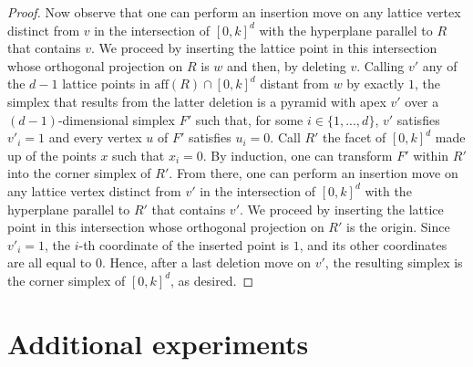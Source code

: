 \begin{proof}
Now observe that one can perform an insertion move on any lattice vertex distinct from $v$ in the intersection of $[0,k]^d$ with the hyperplane parallel to $R$ that contains $v$. We proceed by inserting the lattice point in this intersection whose orthogonal projection on $R$ is $w$ and then, by deleting $v$. Calling $v'$ any of the $d-1$ lattice points in $\mathrm{aff}(R)\cap[0,k]^d$ distant from $w$ by exactly $1$, the simplex that results from the latter deletion is a pyramid with apex $v'$ over a $(d-1)$-dimensional simplex $F'$ such that, for some $i\in\{1, ..., d\}$, $v'$ satisfies $v'_i=1$ and every vertex $u$ of $F'$ satisfies $u_i=0$. Call $R'$ the facet of $[0,k]^d$ made up of the points $x$ such that $x_i=0$. By induction, one can transform $F'$ within $R'$ into the corner simplex of $R'$. From there, one can perform an insertion move on any lattice vertex distinct from $v'$ in the intersection of $[0,k]^d$ with the hyperplane parallel to $R'$ that contains $v'$. We proceed by inserting the lattice point in this intersection whose orthogonal projection on $R'$ is the origin. Since $v'_i=1$, the $i$-th coordinate of the inserted point is $1$, and its other coordinates are all equal to $0$. Hence, after a last deletion move on $v'$, the resulting simplex is the corner simplex of $[0,k]^d$, as desired.
\end{proof}

\clearpage
 \section{Additional experiments}\label{Sec.Tab}

